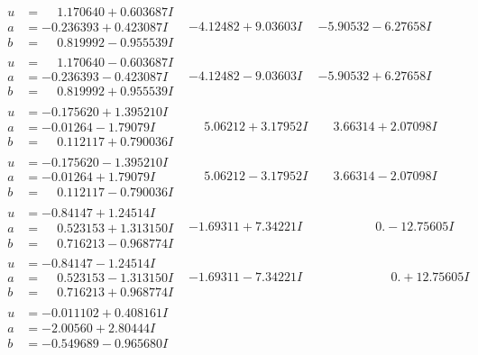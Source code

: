 \documentclass[1p]{elsarticle_modified}
\theoremstyle{definition}
\begin{document}
$$\begin{array}{c|c|c}
\begin{aligned}
u &= \phantom{-}1.170640 + 0.603687 I \\
a &= -0.236393 + 0.423087 I \\
b &= \phantom{-}0.819992 - 0.955539 I\end{aligned}
 & -4.12482 + 9.03603 I & -5.90532 - 6.27658 I \\ \hline\begin{aligned}
u &= \phantom{-}1.170640 - 0.603687 I \\
a &= -0.236393 - 0.423087 I \\
b &= \phantom{-}0.819992 + 0.955539 I\end{aligned}
 & -4.12482 - 9.03603 I & -5.90532 + 6.27658 I \\ \hline\begin{aligned}
u &= -0.175620 + 1.395210 I \\
a &= -0.01264 - 1.79079 I \\
b &= \phantom{-}0.112117 + 0.790036 I\end{aligned}
 & \phantom{-}5.06212 + 3.17952 I & \phantom{-}3.66314 + 2.07098 I \\ \hline\begin{aligned}
u &= -0.175620 - 1.395210 I \\
a &= -0.01264 + 1.79079 I \\
b &= \phantom{-}0.112117 - 0.790036 I\end{aligned}
 & \phantom{-}5.06212 - 3.17952 I & \phantom{-}3.66314 - 2.07098 I \\ \hline\begin{aligned}
u &= -0.84147 + 1.24514 I \\
a &= \phantom{-}0.523153 + 1.313150 I \\
b &= \phantom{-}0.716213 - 0.968774 I\end{aligned}
 & -1.69311 + 7.34221 I & \phantom{-0.000000 } 0. - 12.75605 I \\ \hline\begin{aligned}
u &= -0.84147 - 1.24514 I \\
a &= \phantom{-}0.523153 - 1.313150 I \\
b &= \phantom{-}0.716213 + 0.968774 I\end{aligned}
 & -1.69311 - 7.34221 I & \phantom{-0.000000 -}0. + 12.75605 I \\ \hline\begin{aligned}
u &= -0.011102 + 0.408161 I \\
a &= -2.00560 + 2.80444 I \\
b &= -0.549689 - 0.965680 I\end{aligned}

\end{array}$$
\end{document}
